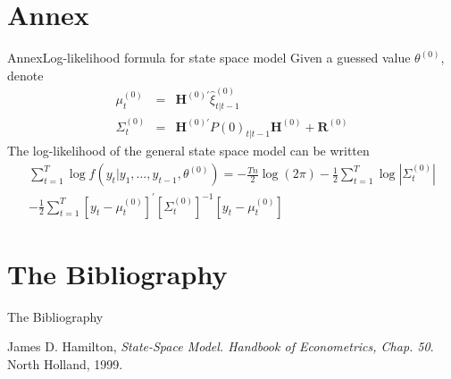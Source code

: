 \documentclass[10pt]{beamer}
\begin{document}
\section*{Annex}
%
\begin{frame}{Annex}{Log-likelihood formula for state space model}
%
Given a guessed value $\theta^{(0)}$, denote 
%
\begin{eqnarray*}
\mu_{t}^{(0)} & = & \mathbf H^{(0)'}\hat\xi^{(0)}_{t\vert t-1}\\
\Sigma_{t}^{(0)} & = & \mathbf H^{(0)'}P{(0)}_{t\vert t-1}\mathbf H^{(0)} + \mathbf R^{(0)}
\end{eqnarray*}
%
The log-likelihood of the general state space model can be written
%
\begin{eqnarray*}
\sum_{t=1}^{T}\log f(y_{t}\vert y_{1},\ldots,y_{t-1},\theta^{(0)}) = -\frac{Tn}{2}\log(2\pi) - \frac{1}{2}\sum^{T}_{t=1}\log|\Sigma_{t}^{(0)}|\\
- \frac{1}{2}\sum^{T}_{t=1}\left[y_{t} - \mu_{t}^{(0)}\right]^{'}\left[\Sigma_{t}^{(0)}\right]^{-1}\left[y_{t} - \mu_{t}^{(0)}\right]
\end{eqnarray*}
%
\end{frame}
%
\section*{The Bibliography}
%
\begin{frame}{The Bibliography}
%
\begin{thebibliography}{9}
%
  James D. Hamilton,
  \emph{State-Space Model. Handbook of Econometrics, Chap. 50}.
  North Holland, 1999.
%
%    
\end{thebibliography}
%
\end{frame}
%
\end{document}
